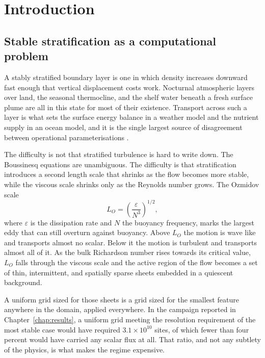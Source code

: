 \chapter{Introduction}
\label{chap:introduction}

\section{Stable stratification as a computational problem}
\label{sec:intro-problem}

A stably stratified boundary layer is one in which density increases downward
fast enough that vertical displacement costs work. Nocturnal atmospheric layers
over land, the seasonal thermocline, and the shelf water beneath a fresh surface
plume are all in this state for most of their existence. Transport across such a
layer is what sets the surface energy balance in a weather model and the
nutrient supply in an ocean model, and it is the single largest source of
disagreement between operational parameterisations \citep{halvorsen2019closure,
brandt2021stableabl}.

The difficulty is not that stratified turbulence is hard to write down. The
Boussinesq equations are unambiguous. The difficulty is that stratification
introduces a second length scale that shrinks as the flow becomes more stable,
while the viscous scale shrinks only as the Reynolds number grows. The Ozmidov
scale
\begin{equation}
  L_O = \left( \frac{\varepsilon}{N^{3}} \right)^{1/2},
  \label{eq:ozmidov-intro}
\end{equation}
where $\varepsilon$ is the dissipation rate and $N$ the buoyancy frequency,
marks the largest eddy that can still overturn against buoyancy. Above $L_O$ the
motion is wave like and transports almost no scalar. Below it the motion is
turbulent and transports almost all of it. As the bulk Richardson number rises
towards its critical value, $L_O$ falls through the viscous scale and the active
region of the flow becomes a set of thin, intermittent, and spatially sparse
sheets embedded in a quiescent background.

A uniform grid sized for those sheets is a grid sized for the smallest feature
anywhere in the domain, applied everywhere. In the campaign reported in
Chapter~\ref{chap:results}, a uniform grid meeting the resolution requirement of
the most stable case would have required $3.1 \times 10^{10}$ sites, of which
fewer than four percent would have carried any scalar flux at all. That ratio,
and not any subtlety of the physics, is what makes the regime expensive.


